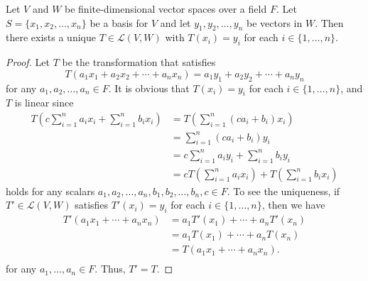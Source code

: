\begin{lemma}
  \label{lem:linear-uniqueness}
  Let $V$ and $W$ be finite-dimensional vector spaces over a field $F$.
  Let $S = \{x_1, x_2, \dots, x_n\}$ be a basis for $V$ and let
  $y_1, y_2, \dots, y_n$ be vectors in $W$.
  Then there exists a unique $T \in \mathcal{L}(V, W)$ with $T(x_i) = y_i$
  for each $i \in \{1, \dots, n\}$.
\end{lemma}
\begin{proof}
  Let $T$ be the transformation that satisfies
  \begin{equation*}
    T(a_1x_1 + a_2x_2 + \cdots + a_nx_n) = a_1y_1 + a_2y_2 + \cdots + a_ny_n
  \end{equation*}
  for any $a_1, a_2, \dots, a_n \in F$.
  It is obvious that $T(x_i) = y_i$ for each $i \in \{1, \dots, n\}$,
  and $T$ is linear since
  \begin{align*}
    T\left(c\sum_{i=1}^na_ix_i + \sum_{i=1}^nb_ix_i\right)
    &= T\left(\sum_{i=1}^n(ca_i + b_i)x_i\right) \\
    &= \sum_{i=1}^n(ca_i + b_i)y_i \\
    &= c\sum_{i=1}^na_iy_i + \sum_{i=1}^nb_iy_i \\
    &= cT\left(\sum_{i=1}^na_ix_i\right) + T\left(\sum_{i=1}^nb_ix_i\right)
  \end{align*}
  holds for any scalars $a_1, a_2, \dots, a_n, b_1, b_2, \dots, b_n, c \in F$.
  To see the uniqueness, if $T' \in \mathcal{L}(V, W)$ satisfies
  $T'(x_i) = y_i$ for each $i \in \{1, \dots, n\}$, then we have
  \begin{align*}
    T'(a_1x_1 + \cdots + a_nx_n)
    &= a_1T'(x_1) + \cdots + a_nT'(x_n) \\
    &= a_1T(x_1) + \cdots + a_nT(x_n) \\
    &= T(a_1x_1 + \cdots + a_nx_n). \\
  \end{align*}
  for any $a_1, \dots, a_n \in F$.
  Thus, $T' = T$.
\end{proof}

